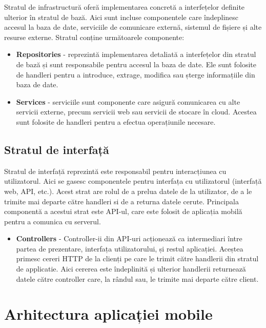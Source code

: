 Stratul de infrastructură oferă implementarea concretă a interfețelor definite ulterior în stratul de bază. Aici sunt incluse componentele care îndeplinesc accesul la baza de date, serviciile de comunicare externă, sistemul de fișiere și alte resurse externe. Stratul conține următoarele componente:


\begin{itemize}
    \item \textbf{Repositories} - reprezintă implementarea detaliată a interfețelor din stratul de bază și sunt responsabile pentru accesul la baza de date. Ele sunt folosite de handleri pentru a introduce, extrage, modifica sau șterge informațiile din baza de date.
    \item \textbf{Services} - serviciile sunt componente care 
    asigură comunicarea cu alte servicii externe, precum servicii web sau servicii de stocare în cloud. Acestea sunt folosite de handleri pentru a efectua operațiunile necesare.
\end{itemize}

\subsection{Stratul de interfață}

Stratul de interfață reprezintă este responsabil pentru interacțiunea cu utilizatorul. Aici se gasesc componentele pentru interfața cu utilizatorul (interfață web, API, etc.). Acest strat are rolul de a prelua datele de la utilizator, de a le trimite mai departe către handleri si de a returna datele cerute. Principala componentă a acestui strat este API-ul, care este folosit de aplicația mobilă pentru a comunica cu serverul.

\begin{itemize}
    \item \textbf{Controllers} - Controller-ii din API-uri acționează ca intermediari între partea de prezentare, interfața utilizatorului, și restul aplicației. Aceștea primesc cereri HTTP de la clienți pe care le trimit către handlerii din stratul de applicatie. Aici cererea este îndeplinită și ulterior handlerii returnează datele către controller care, la rândul sau, le trimite mai departe către client.
\end{itemize}

\newpage


\section{Arhitectura aplicației mobile}




